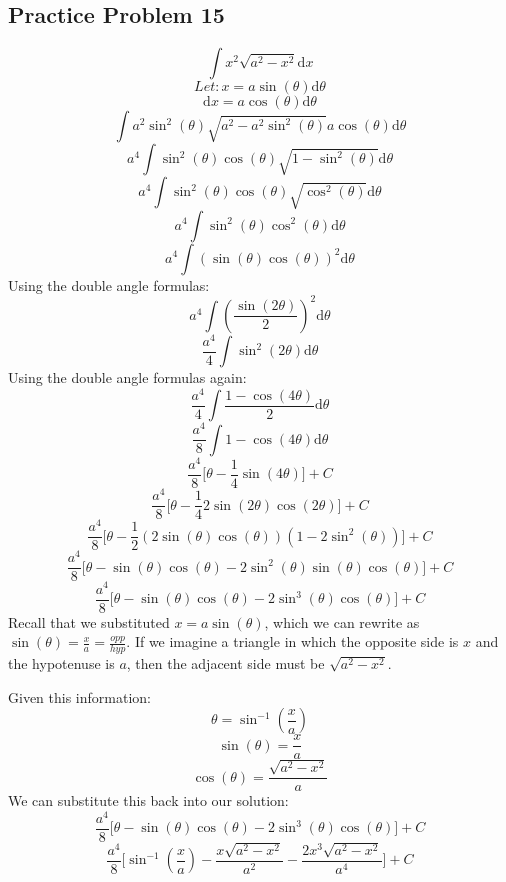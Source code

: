 \documentclass[letterpaper, 12pt]{article}
\renewcommand*{\arcsin}{\sin^{-1}}
\newcommand*{\diff}{\mathrm{d}}
\begin{document}
\subsection*{Practice Problem 15}
\[ \int{x^{2}\sqrt{a^{2}-x^{2}}\diff{x}} \]
\[ Let: x = a\sin(\theta)\diff{\theta} \]
\[ \diff{x} = a\cos(\theta)\diff{\theta} \]
\[ \int{a^{2}\sin^{2}(\theta)
   \sqrt{a^{2}-a^{2}\sin^{2}(\theta)}a\cos(\theta)\diff{\theta}} \]
\[ a^{4}\int{\sin^{2}(\theta)\cos(\theta)
   \sqrt{1-\sin^{2}(\theta)}\diff{\theta}} \]
\[ a^{4}\int{\sin^{2}(\theta)\cos(\theta)
   \sqrt{\cos^{2}(\theta)}\diff{\theta}} \]
\[ a^{4}\int{\sin^{2}(\theta)\cos^{2}(\theta)\diff{\theta}} \]
\[ a^{4}\int{(\sin(\theta)\cos(\theta))^{2}\diff{\theta}} \]
Using the double angle formulas:
\[ a^{4}\int{(\frac{\sin(2\theta)}{2})^{2}\diff{\theta}} \]
\[ \frac{a^{4}}{4}\int{\sin^{2}(2\theta)\diff{\theta}} \]
Using the double angle formulas again:
\[ \frac{a^{4}}{4}\int{\frac{1-\cos(4\theta)}{2}\diff{\theta}} \]
\[ \frac{a^{4}}{8}\int{1-\cos(4\theta)\diff{\theta}} \]
\[ \frac{a^{4}}{8}\bigg[\theta-\frac{1}{4}\sin(4\theta)\bigg]+C \]
\[ \frac{a^{4}}{8}\bigg[\theta-\frac{1}{4}2\sin(2\theta)\cos(2\theta)\bigg]+C \]
\[ \frac{a^{4}}{8}\bigg[\theta-
   \frac{1}{2}(2\sin(\theta)\cos(\theta))(1-2\sin^{2}(\theta))\bigg]+C \]
\[ \frac{a^{4}}{8}\bigg[\theta-
   \sin(\theta)\cos(\theta)-2\sin^{2}(\theta)\sin(\theta)\cos(\theta)\bigg]+C \]
\[ \frac{a^{4}}{8}\bigg[\theta-
   \sin(\theta)\cos(\theta)-2\sin^{3}(\theta)\cos(\theta)\bigg]+C \]
Recall that we substituted \( x = a\sin(\theta) \), which we can rewrite as
\( \sin(\theta) = \frac{x}{a} = \frac{opp}{hyp} \). If we imagine a triangle in
which the opposite side is \( x \) and the hypotenuse is \( a \), then the
adjacent side must be \( \sqrt{a^{2}-x^{2}} \).
\begin{center}
\end{center}
Given this information:
\[ \theta = \arcsin(\frac{x}{a}) \]
\[ \sin(\theta) = \frac{x}{a} \]
\[ \cos(\theta) = \frac{\sqrt{a^{2}-x^{2}}}{a} \]
We can substitute this back into our solution:
\[ \frac{a^{4}}{8}\bigg[\theta-
\sin(\theta)\cos(\theta)-2\sin^{3}(\theta)\cos(\theta)\bigg]+C \]
\[ \frac{a^{4}}{8}\bigg[\arcsin(\frac{x}{a})-
   \frac{x\sqrt{a^{2}-x^{2}}}{a^{2}}-
   \frac{2x^{3}\sqrt{a^{2}-x^{2}}}{a^{4}}\bigg]+C \]
\end{document}
